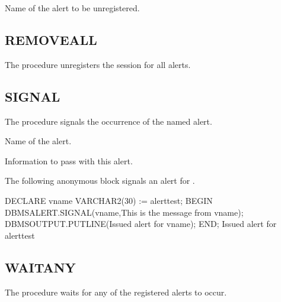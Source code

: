 \documentclass[letterpaper,10pt,english,openany,oneside]{sphinxmanual}
\begin{document}

Name of the alert to be unregistered.


\subsection{REMOVEALL}
\label{\detokenize{dbms_alert:removeall}}
The  procedure unregisters the session for all alerts.



\subsection{SIGNAL}
\label{\detokenize{dbms_alert:signal}}
The  procedure signals the occurrence of the named alert.




Name of the alert.


Information to pass with this alert.

\newpage


The following anonymous block signals an alert for .

%
\begin{sphinxVerbatim}[commandchars=\\\{\}]
DECLARE
    v\PYGZus{}name   VARCHAR2(30) := \PYGZsq{}alert\PYGZus{}test\PYGZsq{};
BEGIN
    DBMS\PYGZus{}ALERT.SIGNAL(v\PYGZus{}name,\PYGZsq{}This is the message from \PYGZsq{} \textbar{}\textbar{} v\PYGZus{}name);
    DBMS\PYGZus{}OUTPUT.PUT\PYGZus{}LINE(\PYGZsq{}Issued alert for \PYGZsq{} \textbar{}\textbar{} v\PYGZus{}name);
END;
Issued alert for alert\PYGZus{}test
\end{sphinxVerbatim}


\subsection{WAITANY}
\label{\detokenize{dbms_alert:waitany}}
The  procedure waits for any of the registered alerts to occur.
\end{document}
